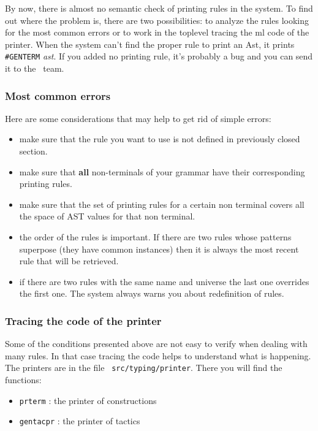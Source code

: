 {  By now, there is almost no semantic check of printing rules in the
  system.  To find out where the problem is, there are two
  possibilities: to analyze the rules looking for the most common
  errors or to work in the toplevel tracing the ml code of the
  printer.
When the system can't find the proper rule to print an Ast, it prints
\verb+#GENTERM+ \textit{ast}. If you added no printing rule,
  it's probably a bug and you can send it to the \Coq\ team.

\subsubsection{Most common errors}
Here are some considerations that may help to get rid of simple
errors:

\begin{itemize}
\item make sure that the rule you want to use is not defined in
  previously closed section.
\item make sure that {\bf all} non-terminals of your grammar have
  their corresponding printing rules.

\item make sure that the set of printing rules for a certain non
  terminal covers all the space of AST values for that non terminal.

\item the order of the rules is important. If there are two rules
  whose patterns superpose (they have common instances) then it is
  always the most recent rule that will be retrieved.
\item if there are two rules with the same name and universe the last
  one overrides the first one. The system always warns you about
  redefinition of rules.
\end{itemize}

\subsubsection{Tracing the {\ocaml} code of the printer}
Some of the conditions presented above are not easy to verify when
dealing with many rules. In that case tracing the code helps to
understand what is happening. The printers are in the file {\tt
src/typing/printer}. There you will find the functions:

\begin{itemize}
\item {\tt prterm} : the printer of constructions
\item {\tt gentacpr} : the printer of tactics
\end{itemize}

}
